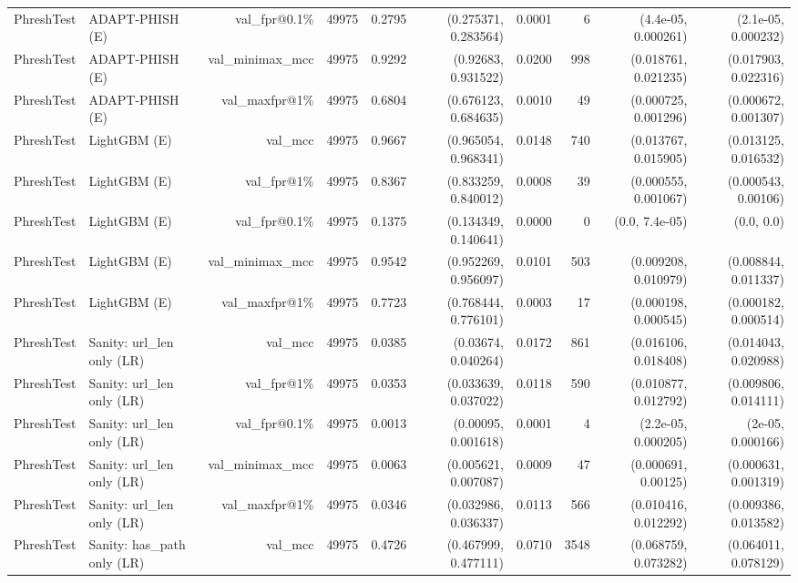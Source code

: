 \begin{table}[t]
\begin{tabular}{llrrrrrrrr}
PhreshTest & ADAPT-PHISH (E) & val\_fpr@0.1\% & 49975 & 0.2795 & (0.275371, 0.283564) & 0.0001 & 6 & (4.4e-05, 0.000261) & (2.1e-05, 0.000232) \\
PhreshTest & ADAPT-PHISH (E) & val\_minimax\_mcc & 49975 & 0.9292 & (0.92683, 0.931522) & 0.0200 & 998 & (0.018761, 0.021235) & (0.017903, 0.022316) \\
PhreshTest & ADAPT-PHISH (E) & val\_maxfpr@1\% & 49975 & 0.6804 & (0.676123, 0.684635) & 0.0010 & 49 & (0.000725, 0.001296) & (0.000672, 0.001307) \\
PhreshTest & LightGBM (E) & val\_mcc & 49975 & 0.9667 & (0.965054, 0.968341) & 0.0148 & 740 & (0.013767, 0.015905) & (0.013125, 0.016532) \\
PhreshTest & LightGBM (E) & val\_fpr@1\% & 49975 & 0.8367 & (0.833259, 0.840012) & 0.0008 & 39 & (0.000555, 0.001067) & (0.000543, 0.00106) \\
PhreshTest & LightGBM (E) & val\_fpr@0.1\% & 49975 & 0.1375 & (0.134349, 0.140641) & 0.0000 & 0 & (0.0, 7.4e-05) & (0.0, 0.0) \\
PhreshTest & LightGBM (E) & val\_minimax\_mcc & 49975 & 0.9542 & (0.952269, 0.956097) & 0.0101 & 503 & (0.009208, 0.010979) & (0.008844, 0.011337) \\
PhreshTest & LightGBM (E) & val\_maxfpr@1\% & 49975 & 0.7723 & (0.768444, 0.776101) & 0.0003 & 17 & (0.000198, 0.000545) & (0.000182, 0.000514) \\
PhreshTest & Sanity: url\_len only (LR) & val\_mcc & 49975 & 0.0385 & (0.03674, 0.040264) & 0.0172 & 861 & (0.016106, 0.018408) & (0.014043, 0.020988) \\
PhreshTest & Sanity: url\_len only (LR) & val\_fpr@1\% & 49975 & 0.0353 & (0.033639, 0.037022) & 0.0118 & 590 & (0.010877, 0.012792) & (0.009806, 0.014111) \\
PhreshTest & Sanity: url\_len only (LR) & val\_fpr@0.1\% & 49975 & 0.0013 & (0.00095, 0.001618) & 0.0001 & 4 & (2.2e-05, 0.000205) & (2e-05, 0.000166) \\
PhreshTest & Sanity: url\_len only (LR) & val\_minimax\_mcc & 49975 & 0.0063 & (0.005621, 0.007087) & 0.0009 & 47 & (0.000691, 0.00125) & (0.000631, 0.001319) \\
PhreshTest & Sanity: url\_len only (LR) & val\_maxfpr@1\% & 49975 & 0.0346 & (0.032986, 0.036337) & 0.0113 & 566 & (0.010416, 0.012292) & (0.009386, 0.013582) \\
PhreshTest & Sanity: has\_path only (LR) & val\_mcc & 49975 & 0.4726 & (0.467999, 0.477111) & 0.0710 & 3548 & (0.068759, 0.073282) & (0.064011, 0.078129) \\

\end{tabular}
\end{table}
